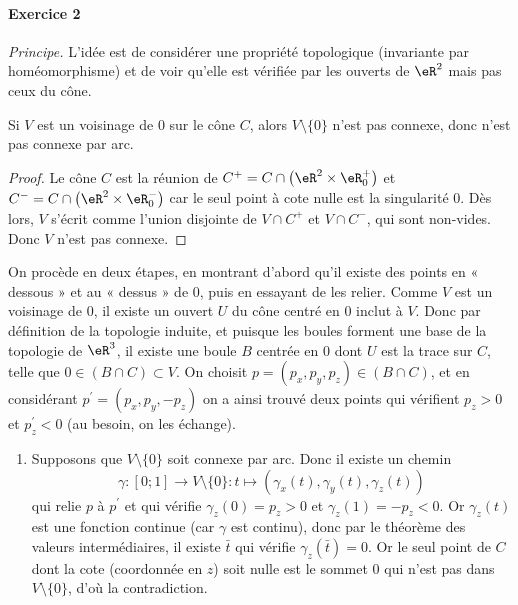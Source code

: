  \paragraph{Exercice 2}
 \emph{Principe.} L'idée est de considérer une propriété topologique
 (invariante par homéomorphisme) et de voir qu'elle est vérifiée par
 les ouverts de $\eR^2$ mais pas ceux du cône.

 \begin{lemma}Si $V$ est un voisinage de $0$ sur le cône $C$, alors
   $V\setminus\{0\}$ n'est pas connexe, donc n'est pas connexe par
   arc.\end{lemma}
 \begin{proof}Le cône $C$ est la réunion de $C^+ = C \cap
   \left(\eR^2\times \eR_0^+\right)$ et $C^- = C \cap \left(\eR^2\times
     \eR_0^-\right)$ car le seul point à cote nulle est la singularité
   $0$. Dès lors, $V$ s'écrit comme l'union disjointe de $V\cap C^+$
   et $V\cap C^-$, qui sont non-vides. Donc $V$ n'est pas
   connexe.\end{proof}

On procède en deux étapes, en montrant d'abord qu'il
   existe des points en « dessous » et au « dessus » de
   $0$, puis en essayant de les relier.
     Comme $V$ est un voisinage de $0$, il existe un ouvert $U$ du
     cône centré en $0$ inclut à $V$. Donc par définition de la
     topologie induite, et puisque les boules forment une base de la
     topologie de $\eR^3$, il existe une boule $B$ centrée en $0$ dont
     $U$ est la trace sur $C$, telle que $0 \in (B \cap C) \subset
     V$. On choisit $p = (p_x,p_y,p_z) \in (B \cap C)$, et en
     considérant $p^\prime = (p_x, p_y, -p_z)$ on a ainsi trouvé deux
     points qui vérifient $p_z > 0$ et $p^\prime_z < 0$ (au besoin,
     on les échange).

   \begin{enumerate}
   \item Supposons que $V\setminus\{0\}$ soit connexe par arc. Donc
     il existe un chemin
     \[\gamma : [0;1] \to V\setminus\{0\} : t \mapsto
     (\gamma_x(t),\gamma_y(t),\gamma_z(t))\] qui relie $p$ à
     $p^\prime$ et qui vérifie $\gamma_z(0) = p_z > 0$ et
     $\gamma_z(1) = -p_z < 0$. Or $\gamma_z(t)$ est une fonction
     continue (car $\gamma$ est continu), donc par le théorème des
     valeurs intermédiaires, il existe $\bar t$ qui vérifie
     $\gamma_z(\bar t) = 0$. Or le seul point de $C$ dont la cote
     (coordonnée en $z$) soit nulle est le sommet $0$ qui n'est pas
     dans $V\setminus\{0\}$, d'où la contradiction.
   \end{enumerate}

